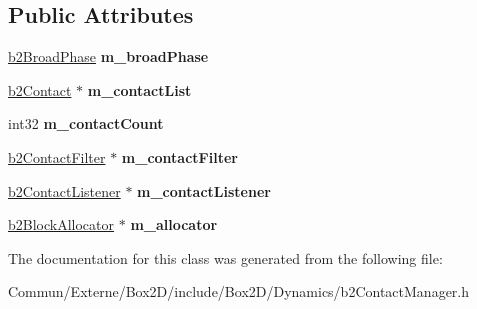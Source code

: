 \subsection*{Public Attributes}
\begin{DoxyCompactItemize}
\item 
\hyperlink{classb2_broad_phase}{b2\+Broad\+Phase} {\bfseries m\+\_\+broad\+Phase}\hypertarget{classb2_contact_manager_af85a9c7b0fb138b9fb635dbcf3b0b482}{}\label{classb2_contact_manager_af85a9c7b0fb138b9fb635dbcf3b0b482}

\item 
\hyperlink{classb2_contact}{b2\+Contact} $\ast$ {\bfseries m\+\_\+contact\+List}\hypertarget{classb2_contact_manager_aaca5f490daffabd29f7ad809921224b3}{}\label{classb2_contact_manager_aaca5f490daffabd29f7ad809921224b3}

\item 
int32 {\bfseries m\+\_\+contact\+Count}\hypertarget{classb2_contact_manager_a115b2f9bf38ffd045b26ae91ea696288}{}\label{classb2_contact_manager_a115b2f9bf38ffd045b26ae91ea696288}

\item 
\hyperlink{classb2_contact_filter}{b2\+Contact\+Filter} $\ast$ {\bfseries m\+\_\+contact\+Filter}\hypertarget{classb2_contact_manager_accf0e9232b9eeff002220ecb8d37a17f}{}\label{classb2_contact_manager_accf0e9232b9eeff002220ecb8d37a17f}

\item 
\hyperlink{classb2_contact_listener}{b2\+Contact\+Listener} $\ast$ {\bfseries m\+\_\+contact\+Listener}\hypertarget{classb2_contact_manager_ac3565501f5ab42323050712b244bfe9a}{}\label{classb2_contact_manager_ac3565501f5ab42323050712b244bfe9a}

\item 
\hyperlink{classb2_block_allocator}{b2\+Block\+Allocator} $\ast$ {\bfseries m\+\_\+allocator}\hypertarget{classb2_contact_manager_a20c57f602aa349239df715de5294821d}{}\label{classb2_contact_manager_a20c57f602aa349239df715de5294821d}

\end{DoxyCompactItemize}


The documentation for this class was generated from the following file\+:\begin{DoxyCompactItemize}
\item 
Commun/\+Externe/\+Box2\+D/include/\+Box2\+D/\+Dynamics/b2\+Contact\+Manager.\+h\end{DoxyCompactItemize}

